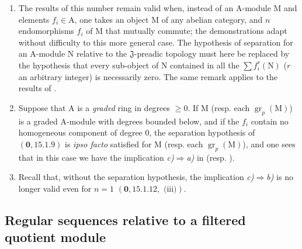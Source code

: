 \begin{remarks}[19.5.6]
\label{IV.19.5.6}
\medskip\noindent
\begin{enumerate}
\item[\rm(i)] The results of this number remain valid when, instead of an $\mathrm{A}$-module $\mathrm{M}$ and elements $f_i\in\mathrm{A}$, one takes an object $\mathrm{M}$ of any abelian category, and $n$ endomorphisms $f_i$ of $\mathrm{M}$ that mutually commute; the demonstrations adapt without difficulty to this more general case. The hypothesis of separation for an $\mathrm{A}$-module $\mathrm{N}$ relative to the $\mathfrak{J}$-preadic topology must here be replaced by the hypothesis that every sub-object of $\mathrm{N}$ contained in all the $\sum f_i^r(\mathrm{N})$ ($r$ an arbitrary integer) is necessarily zero. The same remark applies to the results of .
\item[\rm(ii)] Suppose that $\mathrm{A}$ is a \emph{graded} ring in degrees $\geq0$. If $\mathrm{M}$ (resp. each $\operatorname{gr}_p(\mathrm{M})$) is a graded $\mathrm{A}$-module with degrees bounded below, and if the $f_i$ contain no homogeneous component of degree $0$, the separation hypothesis of $(\mathbf{0},15.1.9)$ is \emph{ipso facto} satisfied for $\mathrm{M}$ (resp. each $\operatorname{gr}_p(\mathrm{M})$), and one sees that in this case we have the implication \emph{c)}$\Rightarrow$\emph{a)} in  (resp. ).
\item[\rm(iii)] Recall that, without the separation hypothesis, the implication \emph{c)}$\Rightarrow$\emph{b)} is no longer valid even for $n=1$ $(\mathbf{0},15.1.12,\text{ (iii)})$.
\end{enumerate}
\end{remarks}

\subsection{Regular sequences relative to a filtered quotient module}
\label{subsection:IV.19.6}

